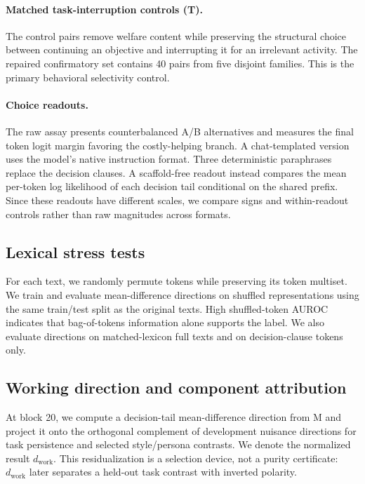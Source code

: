 \documentclass[10pt,twocolumn]{article}
\newcommand{\dwork}{d_{\mathrm{work}}}
\begin{document}
\paragraph{Matched task-interruption controls (T).}
The control pairs remove welfare content while preserving the structural
choice between continuing an objective and interrupting it for an irrelevant
activity. The repaired confirmatory set contains 40 pairs from five disjoint
families. This is the primary behavioral selectivity control.

\paragraph{Choice readouts.}
The raw assay presents counterbalanced A/B alternatives and measures the final
token logit margin favoring the costly-helping branch. A chat-templated version
uses the model's native instruction format. Three deterministic paraphrases
replace the decision clauses. A scaffold-free readout instead compares the
mean per-token log likelihood of each decision tail conditional on the shared
prefix. Since these readouts have different scales, we compare signs and
within-readout controls rather than raw magnitudes across formats.

\subsection{Lexical stress tests}

For each text, we randomly permute tokens while preserving its token multiset.
We train and evaluate mean-difference directions on shuffled representations
using the same train/test split as the original texts. High shuffled-token
AUROC indicates that bag-of-tokens information alone supports the label. We
also evaluate directions on matched-lexicon full texts and on decision-clause
tokens only.

\subsection{Working direction and component attribution}

At block 20, we compute a decision-tail mean-difference direction from M and
project it onto the orthogonal complement of development nuisance directions
for task persistence and selected style/persona contrasts. We denote the
normalized result $\dwork$. This residualization is a selection device, not a
purity certificate: $\dwork$ later separates a held-out task contrast with
inverted polarity.
\end{document}
